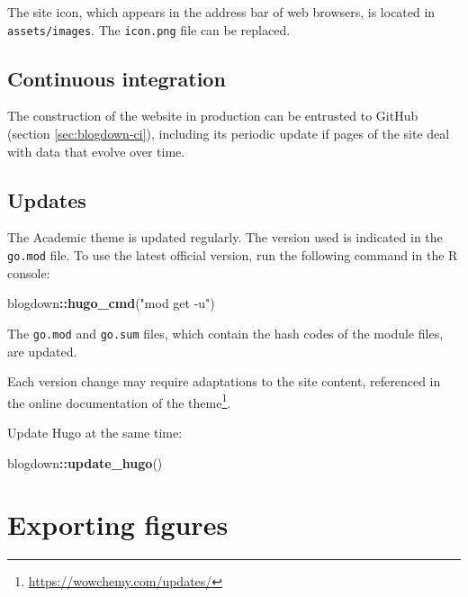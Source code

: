 \documentclass[
  12pt,
  american,
  a4paper,
  extrafontsizes,onecolumn,openright
  ]{memoir}
\newenvironment{Shaded}{\begin{snugshade}}{\end{snugshade}}
\newcommand{\FunctionTok}[1]{\textcolor[rgb]{0.13,0.29,0.53}{\textbf{#1}}}
\newcommand{\NormalTok}[1]{#1}
\newcommand{\SpecialCharTok}[1]{\textcolor[rgb]{0.81,0.36,0.00}{\textbf{#1}}}
\newcommand{\StringTok}[1]{\textcolor[rgb]{0.31,0.60,0.02}{#1}}
\begin{document}
The site icon, which appears in the address bar of web browsers, is located in \texttt{assets/images}.
The \texttt{icon.png} file can be replaced.

\subsection{Continuous integration}\label{sec:rediger-web-ci}

The construction of the website in production can be entrusted to GitHub (section \ref{sec:blogdown-ci}), including its periodic update if pages of the site deal with data that evolve over time.

\subsection{Updates}\label{updates-1}

The Academic theme is updated regularly.
The version used is indicated in the \texttt{go.mod} file.
To use the latest official version, run the following command in the R console:

\scriptsize

\begin{Shaded}
\begin{Highlighting}[]
\NormalTok{blogdown}\SpecialCharTok{::}\FunctionTok{hugo\_cmd}\NormalTok{(}\StringTok{"mod get {-}u"}\NormalTok{)}
\end{Highlighting}
\end{Shaded}

\normalsize

The \texttt{go.mod} and \texttt{go.sum} files, which contain the hash codes of the module files, are updated.

Each version change may require adaptations to the site content, referenced in the online documentation of the theme\footnote{\url{https://wowchemy.com/updates/}}.

Update Hugo at the same time:

\scriptsize

\begin{Shaded}
\begin{Highlighting}[]
\NormalTok{blogdown}\SpecialCharTok{::}\FunctionTok{update\_hugo}\NormalTok{()}
\end{Highlighting}
\end{Shaded}

\normalsize

\section{Exporting figures}\label{exporting-figures}
\end{document}
